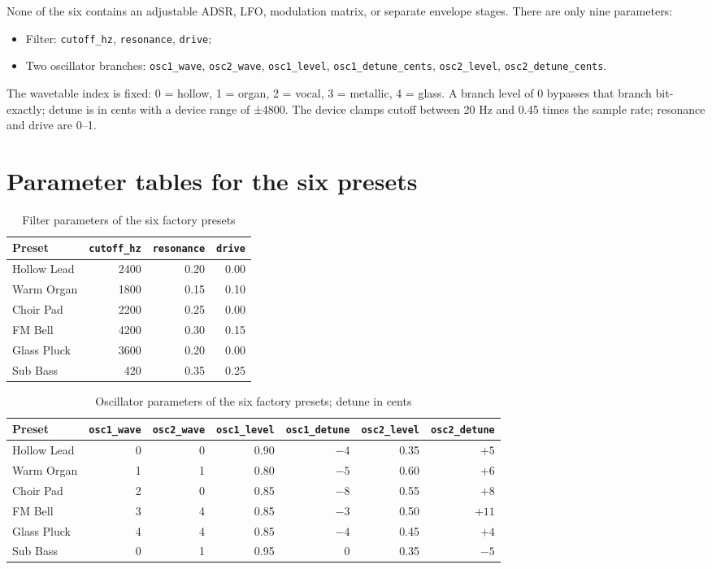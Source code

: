 None of the six contains an adjustable ADSR, LFO, modulation matrix, or
separate envelope stages. There are only nine parameters:

\begin{itemize}
  \item Filter: \texttt{cutoff\_hz}, \texttt{resonance}, \texttt{drive};
  \item Two oscillator branches: \texttt{osc1\_wave}, \texttt{osc2\_wave},
        \texttt{osc1\_level}, \texttt{osc1\_detune\_cents},
        \texttt{osc2\_level}, \texttt{osc2\_detune\_cents}.
\end{itemize}

The wavetable index is fixed: 0 = hollow, 1 = organ, 2 = vocal, 3 = metallic,
4 = glass. A branch level of 0 bypasses that branch bit-exactly; detune is in
cents with a device range of ±4800. The device clamps cutoff between 20 Hz and
0.45 times the sample rate; resonance and drive are 0–1.

\section{Parameter tables for the six presets}

\begin{table}[htbp]
\centering
\small
\begin{tabular}{@{}lrrr@{}}
\hline
Preset & \texttt{cutoff\_hz} & \texttt{resonance} & \texttt{drive} \\
\hline
Hollow Lead & 2400 & 0.20 & 0.00 \\
Warm Organ & 1800 & 0.15 & 0.10 \\
Choir Pad & 2200 & 0.25 & 0.00 \\
FM Bell & 4200 & 0.30 & 0.15 \\
Glass Pluck & 3600 & 0.20 & 0.00 \\
Sub Bass & 420 & 0.35 & 0.25 \\
\hline
\end{tabular}
\caption{Filter parameters of the six factory presets}
\label{tab:voice-filter}
\end{table}

\begin{table}[htbp]
\centering
\small
\begin{tabular}{@{}lrrrrrr@{}}
\hline
Preset & \texttt{osc1\_wave} & \texttt{osc2\_wave} & \texttt{osc1\_level} & \texttt{osc1\_detune} & \texttt{osc2\_level} & \texttt{osc2\_detune} \\
\hline
Hollow Lead & 0 & 0 & 0.90 & $-4$ & 0.35 & $+5$ \\
Warm Organ & 1 & 1 & 0.80 & $-5$ & 0.60 & $+6$ \\
Choir Pad & 2 & 0 & 0.85 & $-8$ & 0.55 & $+8$ \\
FM Bell & 3 & 4 & 0.85 & $-3$ & 0.50 & $+11$ \\
Glass Pluck & 4 & 4 & 0.85 & $-4$ & 0.45 & $+4$ \\
Sub Bass & 0 & 1 & 0.95 & $0$ & 0.35 & $-5$ \\
\hline
\end{tabular}
\caption{Oscillator parameters of the six factory presets; detune in cents}
\label{tab:voice-osc}
\end{table}

